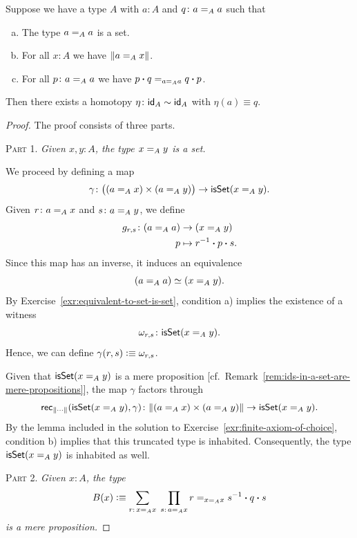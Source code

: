 \begin{lem}\fe\label{lem:conditioned-id-id-homotopy}
    Suppose we have a type\/ $A$ with\/ $a\colon A$ and\/ $q\colon a\eq Aa$ such that
    \begin{enumerate}[a),font=\upshape]
        \item The type\/ $a\mathrel{=_{A}}a$ is a set.
        \item For all\/ $x\colon A$ we have\/ $\lVert a\mathrel{=_{A}}x\rVert$.
        \item For all\/ $p\colon a\eq Aa$ we have\/ $p\mathbin{\boldsymbol{\cdot}} q\mathrel{=_{a\mathrel{=_{A}}a}}q\mathbin{\boldsymbol{\cdot}} p$.
    \end{enumerate}
    Then there exists a homotopy\/ $\eta\colon\id_A\sim\id_A$ with\/ $\eta(a)\equiv q$.
\end{lem}

\begin{proof}
    The proof consists of three parts.

    \textsc{Part 1.} {\itshape Given\/ $x,y\colon A$, the type\/ $x\mathrel{=_{A}}y$ is a set.}

    We proceed by defining a map
    \[
        \gamma\colon
            \bigl(
                (a\eq Ax)\times(a\eq Ay)
            \bigr)
            \to\fun{isSet}(x\eq Ay).
    \]
    Given $r\colon a\eq Ax$ and $s\colon a\eq Ay$, we define
    \begin{align*}
        g_{r,s}\colon(a\eq Aa)&\to(x\eq Ay)\\
        p&\mapsto r^{-1}\ct p\ct s.
    \end{align*}
    Since this map has an inverse, it induces an equivalence
    \[
        (a\mathrel{=_{A}}a)\simeq(x\mathrel{=_{A}}y).
    \]
    By Exercise~\ref{exr:equivalent-to-set-is-set}, condition a) implies the existence of a witness 
    \[
        \omega_{r,s}\colon\fun{isSet}(x\eq Ay).
    \]
    Hence, we can define $\gamma(r,s)\mathrel{\vcentcolon}\equiv\omega_{r,s}$.

    Given that $\mathsf{isSet}(x\mathrel{=_{A}}y)$ is a mere proposition [cf.~Remark~\ref{rem:ids-in-a-set-are-mere-propositions}], the map $\gamma$ factors through
    \[
        \fun{rec}_{\lVert\cdots\rVert}(\fun{isSet}(x\eq Ay),\gamma)
        \colon
            \lVert(a\eq Ax)\times(a\eq Ay)\rVert
            \to\fun{isSet}(x\eq Ay).
    \]
    By the lemma included in the solution to Exercise~\ref{exr:finite-axiom-of-choice}, condition b) implies that this truncated type is inhabited. Consequently, the type $\mathsf{isSet}(x\mathrel{=_{A}}y)$ is inhabited as well.

    \textsc{Part 2.} {\itshape Given\/ $x\colon A$, the type
    \[
        B(x)\defeq\sum_{r\colon x\eq Ax}\;\prod_{s\colon a\eq Ax}
            r\eq{x\eq Ax}s^{-1}\ct q\ct s
    \]
    is a mere proposition.}
    

\end{proof}
